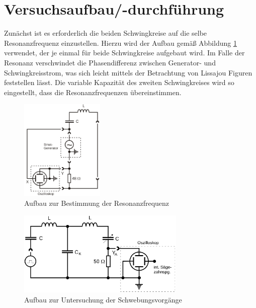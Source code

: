 \section{Versuchsaufbau/-durchführung}

Zunächst ist es erforderlich die beiden Schwingkreise auf die selbe Resonanzfrequenz einzustellen.
Hierzu wird der Aufbau gemäß Abbildung \ref{fig: resonanzfrequenz} verwendet, der je einmal
für beide Schwingkreise aufgebaut wird. Im Falle der Resonanz verschwindet die Phasendifferenz
zwischen Generator- und Schwingkreisstrom, was sich leicht mittels der Betrachtung von Lissajou
Figuren feststellen lässt. Die variable Kapazität des zweiten Schwingkreises wird so eingestellt, dass
die Resonanzfrequenzen übereinstimmen.
\begin{figure}
  \centering
  \includegraphics[width = 4cm]{pics/aufbau_resonanzfrequenz.png}
  \caption{Aufbau zur Bestimmung der Resonanzfrequenz \cite{anleitung355}}
  \label{fig: resonanzfrequenz}
\end{figure}


\begin{figure}
  \centering
  \includegraphics[width = 8cm]{pics/aufbau_schwebung.png}
  \caption{Aufbau zur Untersuchung der Schwebungsvorgänge \cite{anleitung355}}
  \label{fig: schwebung}
\end{figure}
